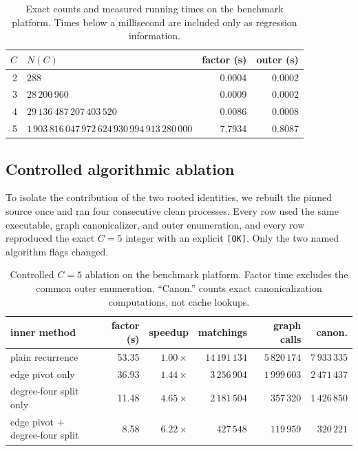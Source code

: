 \documentclass[11pt]{article}
\theoremstyle{definition}
\theoremstyle{remark}
\newcommand{\Nfive}{1\,903\,816\,047\,972\,624\,930\,994\,913\,280\,000}
\begin{document}
\begin{table}[H]
  \centering
  \caption{Exact counts and measured running times on the benchmark platform.
  Times below a millisecond are included only as regression information.}
  \label{tab:counts}
  \begin{tabular}{r>{\raggedleft\arraybackslash}p{8.0cm}rr}
    \toprule
    $C$ & $N(C)$ & factor (s) & outer (s) \\
    \midrule
    2 & $288$ & 0.0004 & 0.0002 \\
    3 & $28\,200\,960$ & 0.0009 & 0.0002 \\
    4 & $29\,136\,487\,207\,403\,520$ & 0.0086 & 0.0008 \\
    5 & $\Nfive$ & 7.7934 & 0.8087 \\
    \bottomrule
  \end{tabular}
\end{table}

\subsection{Controlled algorithmic ablation}

To isolate the contribution of the two rooted identities, we rebuilt the
pinned source once and ran four consecutive clean processes.  Every row used
the same executable, graph canonicalizer, and outer enumeration, and every row
reproduced the exact $C=5$ integer with an explicit \texttt{[OK]}.  Only the
two named algorithm flags changed.

\begin{table}[H]
  \centering
  \caption{Controlled $C=5$ ablation on the benchmark platform.  Factor time
  excludes the common outer enumeration.  ``Canon.'' counts exact
  canonicalization computations, not cache lookups.}
  \label{tab:ablation}
  \small
  \begin{tabular}{lrrrrr}
    \toprule
    inner method & factor (s) & speedup & matchings & graph calls & canon. \\
    \midrule
    plain recurrence
      & 53.35 & $1.00\times$ & $14\,191\,134$ & $5\,820\,174$ & $7\,933\,335$ \\
    edge pivot only
      & 36.93 & $1.44\times$ & $3\,256\,904$ & $1\,999\,603$ & $2\,471\,437$ \\
    degree-four split only
      & 11.48 & $4.65\times$ & $2\,181\,504$ & $357\,320$ & $1\,426\,850$ \\
    edge pivot $+$ degree-four split
      &  8.58 & $6.22\times$ & $427\,548$ & $119\,959$ & $320\,221$ \\
    \bottomrule
  \end{tabular}
\end{table}
\end{document}

